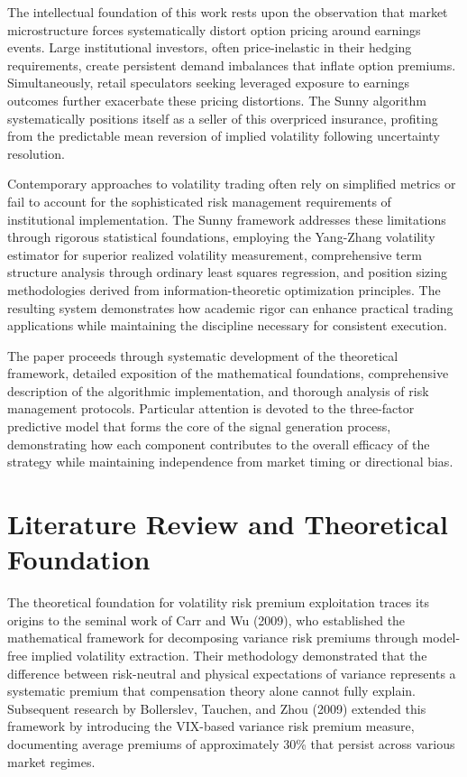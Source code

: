 \documentclass[
  american,
  11pt,
  11pt,
  letterpaper,
  onecolumn]{article}
\begin{document}
The intellectual foundation of this work rests upon the observation that
market microstructure forces systematically distort option pricing
around earnings events. Large institutional investors, often
price-inelastic in their hedging requirements, create persistent demand
imbalances that inflate option premiums. Simultaneously, retail
speculators seeking leveraged exposure to earnings outcomes further
exacerbate these pricing distortions. The Sunny algorithm systematically
positions itself as a seller of this overpriced insurance, profiting
from the predictable mean reversion of implied volatility following
uncertainty resolution.

Contemporary approaches to volatility trading often rely on simplified
metrics or fail to account for the sophisticated risk management
requirements of institutional implementation. The Sunny framework
addresses these limitations through rigorous statistical foundations,
employing the Yang-Zhang volatility estimator for superior realized
volatility measurement, comprehensive term structure analysis through
ordinary least squares regression, and position sizing methodologies
derived from information-theoretic optimization principles. The
resulting system demonstrates how academic rigor can enhance practical
trading applications while maintaining the discipline necessary for
consistent execution.

The paper proceeds through systematic development of the theoretical
framework, detailed exposition of the mathematical foundations,
comprehensive description of the algorithmic implementation, and
thorough analysis of risk management protocols. Particular attention is
devoted to the three-factor predictive model that forms the core of the
signal generation process, demonstrating how each component contributes
to the overall efficacy of the strategy while maintaining independence
from market timing or directional bias.

\section{Literature Review and Theoretical
Foundation}\label{literature-review-and-theoretical-foundation}

The theoretical foundation for volatility risk premium exploitation
traces its origins to the seminal work of Carr and Wu (2009), who
established the mathematical framework for decomposing variance risk
premiums through model-free implied volatility extraction. Their
methodology demonstrated that the difference between risk-neutral and
physical expectations of variance represents a systematic premium that
compensation theory alone cannot fully explain. Subsequent research by
Bollerslev, Tauchen, and Zhou (2009) extended this framework by
introducing the VIX-based variance risk premium measure, documenting
average premiums of approximately 30\% that persist across various
market regimes.
\end{document}
